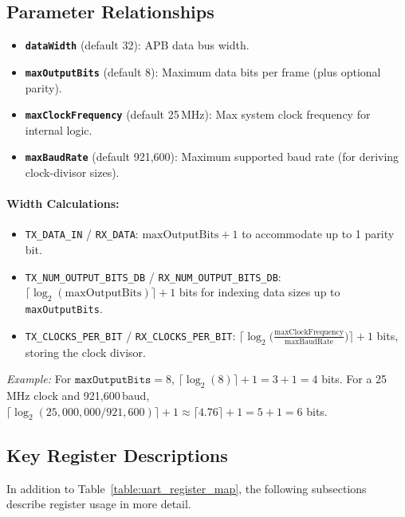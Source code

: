 \label{table:uart_register_map}
\endgroup

\subsection{Parameter Relationships}

\begin{itemize}
\item \textbf{\texttt{dataWidth}} (default 32): APB data bus width.
\item \textbf{\texttt{maxOutputBits}} (default 8): Maximum data bits per frame (plus optional parity).
\item \textbf{\texttt{maxClockFrequency}} (default 25\,MHz): Max system clock frequency for internal logic.
\item \textbf{\texttt{maxBaudRate}} (default 921,600): Maximum supported baud rate (for deriving clock-divisor sizes).
\end{itemize}

\paragraph{Width Calculations:}
\begin{itemize}
\item \texttt{TX\_DATA\_IN} / \texttt{RX\_DATA}: $\text{maxOutputBits}+1$ to accommodate up to 1 parity bit.
\item \texttt{TX\_NUM\_OUTPUT\_BITS\_DB} / \texttt{RX\_NUM\_OUTPUT\_BITS\_DB}: 
  $\lceil\log_2(\text{maxOutputBits})\rceil + 1$ bits for indexing data sizes up to \texttt{maxOutputBits}.
\item \texttt{TX\_CLOCKS\_PER\_BIT} / \texttt{RX\_CLOCKS\_PER\_BIT}: 
  $\lceil\log_2\bigl(\tfrac{\text{maxClockFrequency}}{\text{maxBaudRate}}\bigr)\rceil + 1$ bits, storing the clock divisor.
\end{itemize}

\textit{Example:} For $\texttt{maxOutputBits}=8$, $\lceil\log_2(8)\rceil +1 = 3+1=4$ bits. 
For a 25\,MHz clock and 921,600\,baud, $\lceil\log_2(25{,}000{,}000 / 921{,}600)\rceil +1 \approx \lceil4.76\rceil+1=5+1=6$ bits.

\subsection{Key Register Descriptions}

In addition to Table~\ref{table:uart_register_map}, the following subsections describe register usage in more detail.

